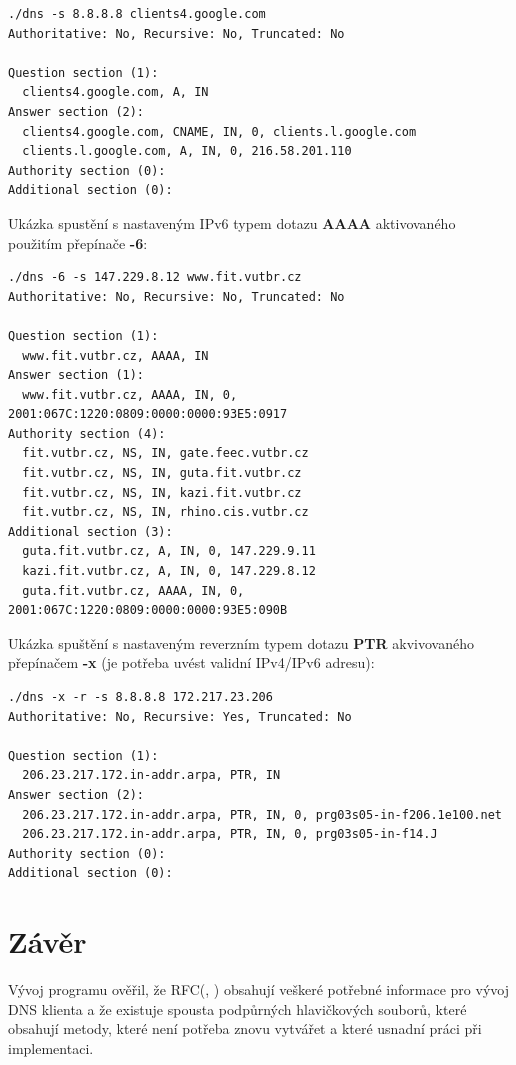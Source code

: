\documentclass[a4paper,11pt]{article}
\begin{document}
\begin{lstlisting}[frame=single]
./dns -s 8.8.8.8 clients4.google.com
Authoritative: No, Recursive: No, Truncated: No

Question section (1):
  clients4.google.com, A, IN
Answer section (2):
  clients4.google.com, CNAME, IN, 0, clients.l.google.com
  clients.l.google.com, A, IN, 0, 216.58.201.110
Authority section (0):
Additional section (0):
\end{lstlisting}

\newpage

Ukázka spustění s nastaveným IPv6 typem dotazu \textbf{AAAA} aktivovaného použitím přepínače \textbf{-6}:

\begin{lstlisting}[frame=single]
./dns -6 -s 147.229.8.12 www.fit.vutbr.cz
Authoritative: No, Recursive: No, Truncated: No

Question section (1):
  www.fit.vutbr.cz, AAAA, IN
Answer section (1):
  www.fit.vutbr.cz, AAAA, IN, 0, 2001:067C:1220:0809:0000:0000:93E5:0917
Authority section (4):
  fit.vutbr.cz, NS, IN, gate.feec.vutbr.cz
  fit.vutbr.cz, NS, IN, guta.fit.vutbr.cz
  fit.vutbr.cz, NS, IN, kazi.fit.vutbr.cz
  fit.vutbr.cz, NS, IN, rhino.cis.vutbr.cz
Additional section (3):
  guta.fit.vutbr.cz, A, IN, 0, 147.229.9.11
  kazi.fit.vutbr.cz, A, IN, 0, 147.229.8.12
  guta.fit.vutbr.cz, AAAA, IN, 0, 2001:067C:1220:0809:0000:0000:93E5:090B
\end{lstlisting}

Ukázka spuštění s nastaveným reverzním typem dotazu \textbf{PTR} akvivovaného přepínačem \textbf{-x} (je potřeba uvést validní IPv4/IPv6 adresu):

\begin{lstlisting}[frame=single]
./dns -x -r -s 8.8.8.8 172.217.23.206
Authoritative: No, Recursive: Yes, Truncated: No

Question section (1):
  206.23.217.172.in-addr.arpa, PTR, IN
Answer section (2):
  206.23.217.172.in-addr.arpa, PTR, IN, 0, prg03s05-in-f206.1e100.net
  206.23.217.172.in-addr.arpa, PTR, IN, 0, prg03s05-in-f14.J
Authority section (0):
Additional section (0):
\end{lstlisting}

\section{Závěr}

Vývoj programu ověřil, že RFC(\cite{rfc10135}, \cite{rfc13596}) obsahují veškeré potřebné informace pro vývoj DNS klienta a že existuje spousta podpůrných hlavičkových souborů, které obsahují metody, které není potřeba znovu vytvářet a které usnadní práci při implementaci.

\newpage




\end{document}
